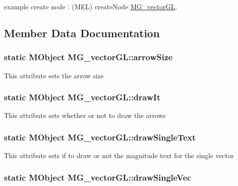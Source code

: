 example create node \-: (M\-E\-L) create\-Node \hyperlink{class_m_g__vector_g_l}{M\-G\-\_\-vector\-G\-L}. 

\subsection{Member Data Documentation}
\hypertarget{class_m_g__vector_g_l_a51ce57b6d4cac43cf6b9fbdf377691c4}{
\subsubsection[{arrow\-Size}]{\setlength{\rightskip}{0pt plus 5cm}static M\-Object M\-G\-\_\-vector\-G\-L\-::arrow\-Size\hspace{0.3cm}{\ttfamily [static]}}}\label{class_m_g__vector_g_l_a51ce57b6d4cac43cf6b9fbdf377691c4}
This attribute sets the arrow size \hypertarget{class_m_g__vector_g_l_a5d59b4c3dfc50250558acfabca45a260}{
\subsubsection[{draw\-It}]{\setlength{\rightskip}{0pt plus 5cm}static M\-Object M\-G\-\_\-vector\-G\-L\-::draw\-It\hspace{0.3cm}{\ttfamily [static]}}}\label{class_m_g__vector_g_l_a5d59b4c3dfc50250558acfabca45a260}
This attribute sets whether or not to draw the arrows \hypertarget{class_m_g__vector_g_l_a1a1b1a7aeae809b9b6d97019136a2399}{
\subsubsection[{draw\-Single\-Text}]{\setlength{\rightskip}{0pt plus 5cm}static M\-Object M\-G\-\_\-vector\-G\-L\-::draw\-Single\-Text\hspace{0.3cm}{\ttfamily [static]}}}\label{class_m_g__vector_g_l_a1a1b1a7aeae809b9b6d97019136a2399}
This attribute sets if to draw or not the magnitude text for the single vector \hypertarget{class_m_g__vector_g_l_a234b67d8d0ff1579b5849207c8751e48}{
\subsubsection[{draw\-Single\-Vec}]{\setlength{\rightskip}{0pt plus 5cm}static M\-Object M\-G\-\_\-vector\-G\-L\-::draw\-Single\-Vec\hspace{0.3cm}{\ttfamily [static]}}}\label{class_m_g__vector_g_l_a234b67d8d0ff1579b5849207c8751e48}
